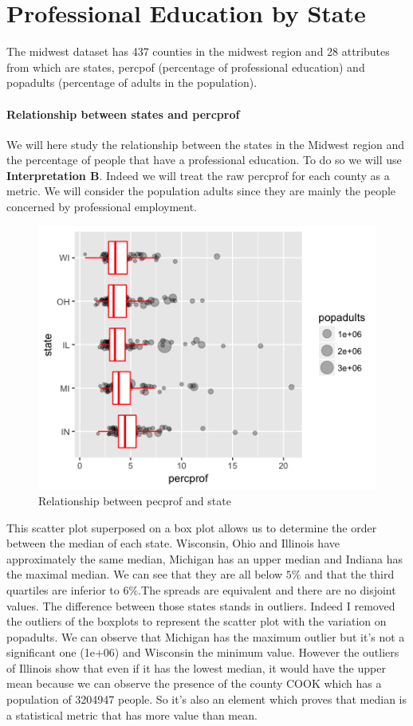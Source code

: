 \documentclass{article}
\begin{document}
\section{Professional Education by State}

The midwest dataset has 437 counties in the midwest region and 28 attributes from which are states, percpof (percentage of professional education) and popadults (percentage of adults in the population).

\paragraph{Relationship between states and percprof}
We will here study the relationship between the states in the Midwest region and the percentage of people that have a professional education. To do so we will use \textbf{Interpretation B}. Indeed we will treat the raw percprof for each county as a metric. We will consider the population adults since they are mainly the people concerned by professional employment.

\begin{figure}[!ht]
\centering
\includegraphics[width=.8\textwidth]{question1.png}
 \caption{Relationship between pecprof and state}
\label{question1}
\end{figure}

This scatter plot superposed on a box plot allows us to determine the order between the median of each state. Wisconsin, Ohio and Illinois have approximately the same median, Michigan has an upper median and Indiana has the maximal median. We can see that they are all below $5\%$ and that the third quartiles are inferior to $6\%$.The spreads are equivalent and there are no disjoint values. The difference between those states stands in outliers. Indeed I removed the outliers of the boxplots to represent the scatter plot with the variation on popadults. We can observe that Michigan has the maximum outlier but it's not a significant one (1e+06) and Wisconsin the minimum value. However the outliers of Illinois show that even if it has the lowest median, it would have the upper mean because we can observe the presence of the county COOK which has a population of 3204947 people. So it's also an element which proves that median is a statistical metric that has more value than mean.
\end{document}
